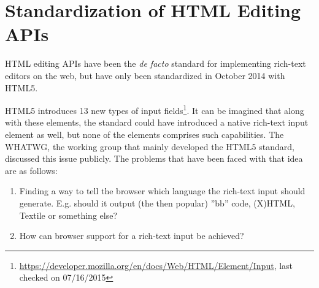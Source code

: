 
\section{Standardization of HTML Editing APIs}
\label{sec:standardization-of-html-editing-apis}





HTML editing APIs have been the \textit{de facto} standard for implementing rich-text editors on the web, but have only been standardized in October 2014 with HTML5. 

HTML5 introduces 13 new types of input fields\footnote{\url{https://developer.mozilla.org/en/docs/Web/HTML/Element/Input}, last checked on 07/16/2015}. It can be imagined that along with these elements, the standard could have introduced a native rich-text input element as well, but none of the elements comprises such capabilities. The WHATWG, the working group that mainly developed the HTML5 standard, discussed this issue publicly. The problems that have been faced with that idea are as follows:


\begin{enumerate} 
\item Finding a way to tell the browser which language the rich-text input should generate. E.g. should it output (the then popular) ''bb'' code, (X)HTML, Textile or something else?
\item How can browser support for a rich-text input be achieved?
\end{enumerate}

